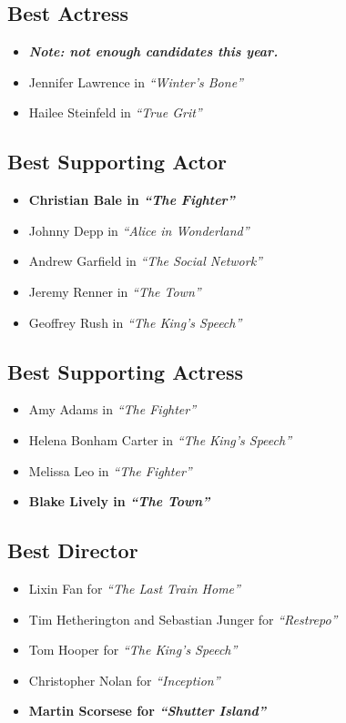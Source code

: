 \documentclass{article}
\begin{document}
\begin{multicols}{2}
\subsection*{Best Actress}
  \begin{itemize}
    \setlength{\parskip}{0pt}
    \setlength{\itemsep}{0pt}
    \scriptsize
    \item[] \textbf{\emph{Note: not enough candidates this year.}}
    \footnotesize
    \item[] Jennifer Lawrence in \emph{``Winter's Bone''}
    \item[] Hailee Steinfeld in \emph{``True Grit''}
  \end{itemize}

\subsection*{Best Supporting Actor}
  \begin{itemize}
    \setlength{\parskip}{0pt}
    \setlength{\itemsep}{0pt}
    \item \textbf{Christian Bale in \emph{``The Fighter''}}
    \item[] Johnny Depp in \emph{``Alice in Wonderland''}
    \item[] Andrew Garfield in \emph{``The Social Network''}
    \item[] Jeremy Renner in \emph{``The Town''}
    \item[] Geoffrey Rush in \emph{``The King's Speech''}
  \end{itemize}

\subsection*{Best Supporting Actress}
  \begin{itemize}
    \setlength{\parskip}{0pt}
    \setlength{\itemsep}{0pt}
    \item[] Amy Adams in \emph{``The Fighter''}
    \item[] Helena Bonham Carter in \emph{``The King's Speech''}
    \item[] Melissa Leo in \emph{``The Fighter''}
    \item \textbf{Blake Lively in \emph{``The Town''}}
  \end{itemize}

\subsection*{Best Director}
  \begin{itemize}
    \setlength{\parskip}{0pt}
    \setlength{\itemsep}{0pt}
    \item[] Lixin Fan for \emph{``The Last Train Home''}
    \item[] Tim Hetherington and Sebastian Junger for \emph{``Restrepo''}
    \item[] Tom Hooper for \emph{``The King's Speech''}
    \item[] Christopher Nolan for \emph{``Inception''}
    \item \textbf{Martin Scorsese for \emph{``Shutter Island''}}
  \end{itemize}


\end{multicols}
\end{document}
